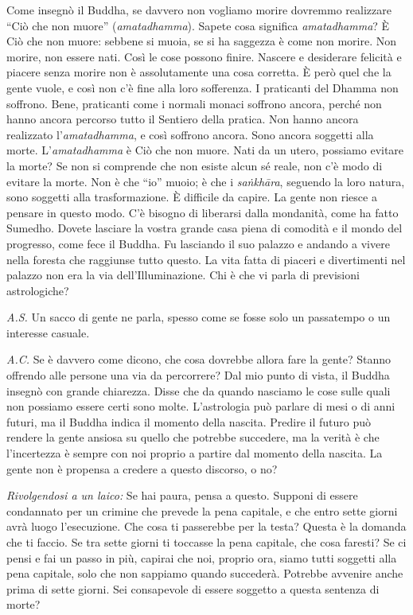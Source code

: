 Come insegnò il Buddha, se davvero non vogliamo morire dovremmo
realizzare ``Ciò che non muore'' (\emph{amatadhamma}). Sapete cosa
significa \emph{amatadhamma}? È Ciò che non muore: sebbene si muoia, se
si ha saggezza è come non morire. Non morire, non essere nati. Così le
cose possono finire. Nascere e desiderare felicità e piacere senza
morire non è assolutamente una cosa corretta. È però quel che la gente
vuole, e così non c'è fine alla loro sofferenza. I praticanti del Dhamma
non soffrono. Bene, praticanti come i normali monaci soffrono ancora,
perché non hanno ancora percorso tutto il Sentiero della pratica. Non
hanno ancora realizzato l'\emph{amatadhamma}, e così soffrono ancora.
Sono ancora soggetti alla morte. L'\emph{amatadhamma} è Ciò che non
muore. Nati da un utero, possiamo evitare la morte? Se non si comprende
che non esiste alcun sé reale, non c'è modo di evitare la morte. Non è
che ``io'' muoio; è che i \emph{saṅkhāra}, seguendo la loro natura, sono
soggetti alla trasformazione. È difficile da capire. La gente non riesce
a pensare in questo modo. C'è bisogno di liberarsi dalla mondanità, come
ha fatto Sumedho. Dovete lasciare la vostra grande casa piena di
comodità e il mondo del progresso, come fece il Buddha. Fu lasciando il
suo palazzo e andando a vivere nella foresta che raggiunse tutto questo.
La vita fatta di piaceri e divertimenti nel palazzo non era la via
dell'Illuminazione. Chi è che vi parla di previsioni astrologiche?

\emph{A.S.} Un sacco di gente ne parla, spesso come se fosse solo un
passatempo o un interesse casuale.

\emph{A.C.} Se è davvero come dicono, che cosa dovrebbe allora fare la gente?
Stanno offrendo alle persone una via da percorrere? Dal mio punto di
vista, il Buddha insegnò con grande chiarezza. Disse che da quando
nasciamo le cose sulle quali non possiamo essere certi sono molte.
L'astrologia può parlare di mesi o di anni futuri, ma il Buddha indica
il momento della nascita. Predire il futuro può rendere la gente ansiosa
su quello che potrebbe succedere, ma la verità è che l'incertezza è
sempre con noi proprio a partire dal momento della nascita. La gente non
è propensa a credere a questo discorso, o no?

\emph{Rivolgendosi a un laico:} Se hai paura, pensa a questo. Supponi di
essere condannato per un crimine che prevede la pena capitale, e che
entro sette giorni avrà luogo l'esecuzione. Che cosa ti passerebbe per
la testa? Questa è la domanda che ti faccio. Se tra sette giorni ti
toccasse la pena capitale, che cosa faresti? Se ci pensi e fai un passo
in più, capirai che noi, proprio ora, siamo tutti soggetti alla pena
capitale, solo che non sappiamo quando succederà. Potrebbe avvenire
anche prima di sette giorni. Sei consapevole di essere soggetto a questa
sentenza di morte?

